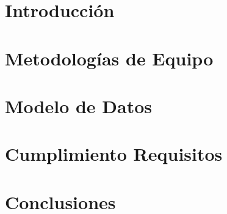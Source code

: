 \documentclass[letterpaper,11pt]{article} %
\begin{document}









\section{Introducción}


\newpage
\section{Metodologías de Equipo}


\newpage
\section{Modelo de Datos}


\newpage
\section{Cumplimiento Requisitos}
% 

\newpage
\section{Conclusiones}



\end{document}
